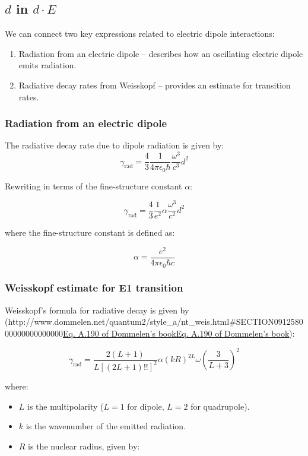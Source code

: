 \documentclass[
]{article}
\let\oldhref\href
\renewcommand{\href}[2]{\ifx#1\urlprefix\oldhref{#1}{#2}\else\uline{\oldhref{#1}{#2}}\fi}
\renewcommand{\[}{\begin{equation}}
\renewcommand{\]}{\end{equation}}
\providecommand{\tightlist}{%
  \setlength{\itemsep}{0pt}\setlength{\parskip}{0pt}}
\begin{document}
\subsection{\texorpdfstring{\(d\) in
\(d \cdot E\)}{d in d \textbackslash cdot E}}\label{d-in-d-cdot-e}

We can connect two key expressions related to electric dipole
interactions:

\begin{enumerate}
\def\labelenumi{\arabic{enumi}.}
\tightlist
\item
  Radiation from an electric dipole -- describes how an oscillating
  electric dipole emits radiation.\\
\item
  Radiative decay rates from Weisskopf -- provides an estimate for
  transition rates.
\end{enumerate}

\subsubsection{Radiation from an electric
dipole}\label{radiation-from-an-electric-dipole}

The radiative decay rate due to dipole radiation is given by: \[
\gamma_{\text{rad}} = \frac{4}{3} \frac{1}{4 \pi \epsilon_0 \hbar} \frac{\omega^3}{c^3} d^2
\]

Rewriting in terms of the fine-structure constant \(\alpha\):

\[
\gamma_{\text{rad}} = \frac{4}{3} \frac{1}{e^2} \alpha \frac{\omega^3}{c^2} d^2
\]

where the fine-structure constant is defined as:

\[
\alpha = \frac{e^2}{4\pi \epsilon_0 \hbar c}
\]

\subsubsection{Weisskopf estimate for E1
transition}\label{weisskopf-estimate-for-e1-transition}

Weisskopf's formula for radiative decay is given by
(\href{http://www.dommelen.net/quantum2/style_a/nt_weis.html\#SECTION091258000000000000000}{Eq.
A.190 of Dommelen's book}):

\[
\gamma_{\text{rad}} = \frac{2 (L+1)}{L \left[(2L+1)!!\right]^2} \alpha (kR)^{2L} \omega \left( \frac{3}{L+3} \right)^2
\]

where:

\begin{itemize}
\tightlist
\item
  \(L\) is the multipolarity (\(L=1\) for dipole, \(L=2\) for
  quadrupole).
\item
  \(k\) is the wavenumber of the emitted radiation.
\item
  \(R\) is the nuclear radius, given by:
\end{itemize}
\end{document}
